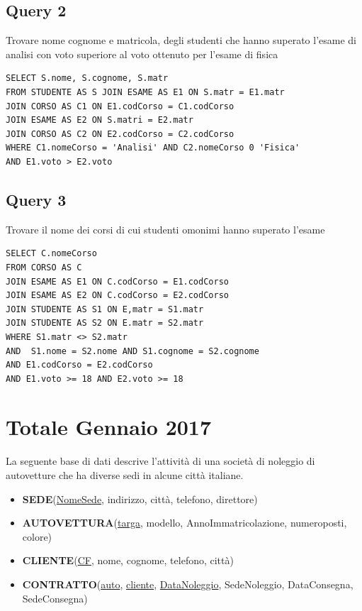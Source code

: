 \subsection{Query 2}
Trovare nome cognome e matricola, degli studenti che hanno superato l'esame di analisi con voto superiore al voto ottenuto per l'esame di fisica

\begin{lstlisting}
SELECT S.nome, S.cognome, S.matr
FROM STUDENTE AS S JOIN ESAME AS E1 ON S.matr = E1.matr
JOIN CORSO AS C1 ON E1.codCorso = C1.codCorso
JOIN ESAME AS E2 ON S.matri = E2.matr
JOIN CORSO AS C2 ON E2.codCorso = C2.codCorso
WHERE C1.nomeCorso = 'Analisi' AND C2.nomeCorso 0 'Fisica'
AND E1.voto > E2.voto
\end{lstlisting}

\subsection{Query 3}
Trovare il nome dei corsi di cui studenti omonimi hanno superato l'esame
\begin{lstlisting}
SELECT C.nomeCorso 
FROM CORSO AS C 
JOIN ESAME AS E1 ON C.codCorso = E1.codCorso
JOIN ESAME AS E2 ON C.codCorso = E2.codCorso
JOIN STUDENTE AS S1 ON E,matr = S1.matr
JOIN STUDENTE AS S2 ON E.matr = S2.matr
WHERE S1.matr <> S2.matr 
AND  S1.nome = S2.nome AND S1.cognome = S2.cognome 
AND E1.codCorso = E2.codCorso
AND E1.voto >= 18 AND E2.voto >= 18
\end{lstlisting}

\newpage
\section{Totale Gennaio 2017}
La seguente base di dati descrive l'attività di una società di noleggio di autovetture che ha diverse sedi in alcune città italiane.

\begin{itemize}
    \item \textbf{SEDE}(\underline{NomeSede}, indirizzo, città, telefono, direttore)
    \item \textbf{AUTOVETTURA}(\underline{targa}, modello, AnnoImmatricolazione, numeroposti, colore)
    \item \textbf{CLIENTE}(\underline{CF}, nome, cognome, telefono, città)
    \item \textbf{CONTRATTO}(\underline{auto}, \underline{cliente}, \underline{DataNoleggio}, SedeNoleggio, DataConsegna, SedeConsegna)
\end{itemize}

